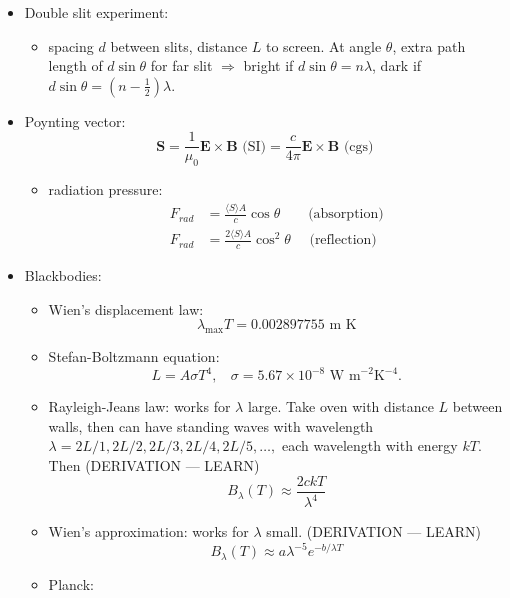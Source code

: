 \documentclass[12pt]{article}
\begin{document}
\begin{itemize}
\begin{itemize}
\end{itemize}
\item Double slit experiment:
\begin{itemize}
\item spacing $d$ between slits, distance $L$ to screen. At angle $\theta$, extra path length of $d\sin\theta$ for far slit $\Longrightarrow$ bright if $d\sin\theta = n\lambda$, dark if $d\sin\theta = (n - \frac{1}{2})\lambda$.
\end{itemize}
\item Poynting vector:
\begin{equation}
\bm{S} = \frac{1}{\mu_0}\bm{E}\times\bm{B}\text{ (SI)} = \frac{c}{4\pi}\bm{E}\times\bm{B}\text{ (cgs)}
\end{equation}
\begin{itemize}
\item radiation pressure:
\begin{align*}
F_{rad} &= \frac{\langle S\rangle A}{c}\cos\theta~~~~~~~~~\text{(absorption)}\\
F_{rad} &= \frac{2\langle S\rangle A}{c}\cos^2\theta~~~~~~\text{(reflection)}
\end{align*}
\end{itemize}
\item Blackbodies:
\begin{itemize}
\item Wien's displacement law:
\begin{equation}
\lambda_\text{max} T = 0.002897755\text{ m K}
\end{equation}
\item Stefan-Boltzmann equation:
\begin{equation}
L = A\sigma T^4,~~~~\sigma = 5.67\times 10^{-8}\text{ W m}^{-2}\text{K}^{-4}.
\end{equation}
\item Rayleigh-Jeans law: works for $\lambda$ large. Take oven with distance $L$ between walls, then can have standing waves with wavelength $\lambda = 2L/1, 2L/2, 2L/3, 2L/4, 2L/5, \dots,$ each wavelength with energy $kT$. Then (DERIVATION --- LEARN)
\begin{equation}
B_\lambda(T)\approx\frac{2ckT}{\lambda^4}
\end{equation}
\item Wien's approximation: works for $\lambda$ small. (DERIVATION --- LEARN)
\begin{equation}
B_\lambda(T) \approx a \lambda^{-5} e^{-b/\lambda T}
\end{equation}
\item Planck:

\end{itemize}
\end{itemize}
\end{document}
